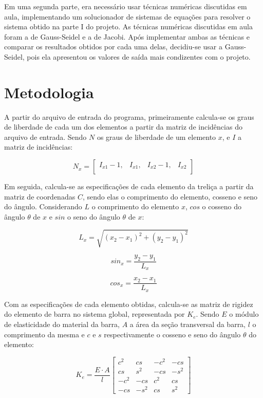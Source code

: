 \documentclass[paper=a4, fontsize=11pt]{scrartcl}
\begin{document}
Em uma segunda parte, era necessário usar técnicas numéricas discutidas em aula, implementando um solucionador de sistemas de equações para resolver o sistema obtido na parte I do projeto. As técnicas numéricas discutidas em aula foram a de Gauss-Seidel e a de Jacobi. Após implementar ambas as técnicas e comparar os resultados obtidos por cada uma delas, decidiu-se usar a Gauss-Seidel, pois ela apresentou os valores de saída mais condizentes com o projeto.

\section{Metodologia}

A partir do arquivo de entrada do programa, primeiramente calcula-se os graus de liberdade de cada um dos elementos a partir da matriz de incidências do arquivo de entrada. Sendo \(N\) os graus de liberdade de um elemento \(x\), e \(I\) a matriz de incidências:


\[N_x =
\begin{bmatrix}
I_{x1} - 1 ,& I_{x1} ,& I_{x2} - 1 ,& I_{x2}  \\
\end{bmatrix}
\]

Em seguida, calcula-se as especificações de cada elemento da treliça a partir da matriz de coordenadas \(C\), sendo elas o comprimento do elemento, cosseno e seno do ângulo. Considerando \(L\) o comprimento do elemento \(x\), \(cos\) o cosseno do ângulo \(\theta\) de \(x\) e \(sin\) o seno do ângulo \(\theta\) de \(x\):

\[L_x = \sqrt{(x_2 - x_1)^2 + (y_2 - y_1)^2}\]

\[sin_x = \frac{y_2 - y_1}{L_x}\]

\[cos_x = \frac{x_2 - x_1}{L_x} \]

Com as especificações de cada elemento obtidas, calcula-se as matriz de rigidez do elemento de barra no sistema global, representada por \(K_e\). Sendo \(E\) o módulo de elasticidade do material da barra, \(A\) a área da seção transversal da barra, \(l\) o comprimento da mesma e \(c\) e \(s\) respectivamente o cosseno e seno do ângulo \(\theta\) do elemento:

\[K_e = \frac{E \cdot A}{l}
\begin{bmatrix}
c^2 & cs & -c^2 & -cs\\
cs & s^2 & -cs & -s^2 \\
-c^2 & -cs & c^2 & cs \\
-cs & -s^2 & cs & s^2
\end{bmatrix}
\]
\end{document}
